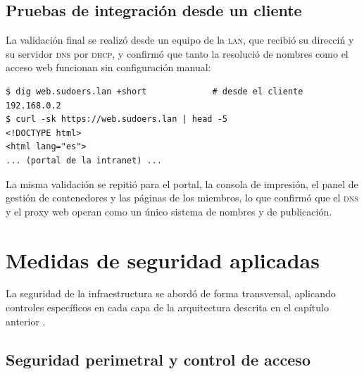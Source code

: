 \subsection{Pruebas de integraci\'on desde un cliente}

La validaci\'on final se realiz\'o desde un equipo de la \textsc{lan}, que
recibi\'o su direcci\'n y su servidor \textsc{dns} por \textsc{dhcp}, y
confirm\'o que tanto la resoluci\'o de nombres como el acceso web funcionan
sin configuraci\'on manual:

\begin{lstlisting}[style=terminal]
$ dig web.sudoers.lan +short             # desde el cliente
192.168.0.2
$ curl -sk https://web.sudoers.lan | head -5
<!DOCTYPE html>
<html lang="es">
... (portal de la intranet) ...
\end{lstlisting}



La misma validaci\'on se repiti\'o para el portal, la consola de impresi\'on,
el panel de gesti\'on de contenedores y las p\'aginas de los miembros, lo que
confirm\'o que el \textsc{dns} y el proxy web operan como un \'unico sistema
de nombres y de publicaci\'on.

\section{Medidas de seguridad aplicadas}

La seguridad de la infraestructura se abord\'o de forma transversal,
aplicando controles espec\'ificos en cada capa de la arquitectura descrita
en el cap\'itulo anterior \cite{stewart2017}.

\subsection{Seguridad perimetral y control de acceso}


